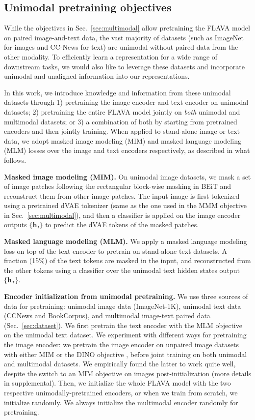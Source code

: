 \documentclass[10pt,twocolumn,letterpaper]{article}
\newcommand{\myparagraph}[1]{\vspace{0.25em}\noindent\textbf{#1}}
\begin{document}
\subsection{Unimodal pretraining objectives}
\label{sec:unimodal}

While the objectives in Sec.~\ref{sec:multimodal} allow pretraining the FLAVA model on paired image-and-text data, the vast majority of datasets (such as ImageNet for images and CC-News for text) are unimodal without paired data from the other modality. To efficiently learn a representation for a wide range of downstream tasks, we would also like to leverage these datasets and incorporate unimodal and unaligned information into our representations.

In this work, we introduce knowledge and information from these unimodal datasets through 1) pretraining the image encoder and text encoder on unimodal datasets; 2) pretraining the entire FLAVA model jointly on \textit{both} unimodal and multimodal datasets; or 3) a combination of both by starting from pretrained encoders and then jointly training. When applied to stand-alone image or text data, we adopt masked image modeling (MIM) and masked language modeling (MLM) losses over the image and text encoders respectively, as described in what follows.

\myparagraph{Masked image modeling (MIM).} On unimodal image datasets, we mask a set of image patches following the rectangular block-wise masking in BEiT \cite{bao2021beit} and reconstruct them from other image patches. The input image is first tokenized using a pretrained dVAE tokenizer \cite{dalle} (same as the one used in the MMM objective in Sec.~\ref{sec:multimodal}), and then a classifier is applied on the image encoder outputs $\{\mathbf{h}_I\}$ to predict the dVAE tokens of the masked patches.

\myparagraph{Masked language modeling (MLM).} We apply a masked language modeling loss \cite{devlin2018bert} on top of the text encoder to pretrain on stand-alone text datasets. A fraction (15\%) of the text tokens are masked in the input, and reconstructed from the other tokens using a classifier over the unimodal text hidden states output $\{\mathbf{h}_T\}$.

\myparagraph{Encoder initialization from unimodal pretraining.} We use three sources of data for pretraining: unimodal image data (ImageNet-1K\cite{imagenet}), unimodal text data (CCNews\cite{liu2019roberta} and BookCorpus\cite{zhu2015aligning}), and multimodal image-text paired data (Sec.~\ref{sec:dataset}). We first pretrain the text encoder with the MLM objective on the unimodal text dataset. We experiment with different ways for pretraining the image encoder: we pretrain the image encoder on unpaired image datasets with either MIM or the DINO objective \cite{caron2021emerging}, before joint training on both unimodal and multimodal datasets. We empirically found the latter to work quite well, despite the switch to an MIM objective on images post-initialization (more details in supplemental).
Then, we initialize the whole FLAVA model with the two respective unimodally-pretrained encoders, or when we train from scratch, we initialize randomly. We always initialize the multimodal encoder randomly for pretraining.
\end{document}
